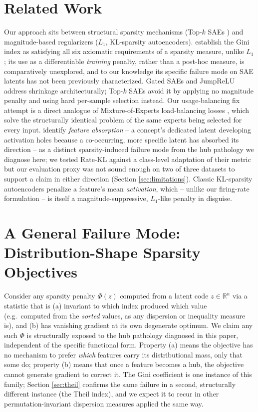 \documentclass[11pt,twocolumn]{article}
\begin{document}
\section{Related Work}
\label{sec:related}
Our approach sits between structural sparsity mechanisms (Top-$k$ SAEs \citep{gao2024topk}) and magnitude-based regularizers ($L_1$, KL-sparsity autoencoders). \citet{hurley2009comparing} establish the Gini index as satisfying all six axiomatic requirements of a sparsity measure, unlike $L_1$; its use as a differentiable \emph{training} penalty, rather than a post-hoc measure, is comparatively unexplored, and to our knowledge its specific failure mode on SAE latents has not been previously characterized. Gated SAEs \citep{lieberum2024gated} and JumpReLU \citep{rajamanoharan2024jumprelu} address shrinkage architecturally; Top-$k$ SAEs \citep{gao2024topk} avoid it by applying no magnitude penalty and using hard per-sample selection instead. Our usage-balancing fix attempt is a direct analogue of Mixture-of-Experts load-balancing losses \citep{shazeer2017outrageously, fedus2022switch}, which solve the structurally identical problem of the same experts being selected for every input. \citet{chanin2024absorption} identify \emph{feature absorption} -- a concept's dedicated latent developing activation holes because a co-occurring, more specific latent has absorbed its direction -- as a distinct sparsity-induced failure mode from the hub pathology we diagnose here; we tested Rate-KL against a class-level adaptation of their metric but our evaluation proxy was not sound enough on two of three datasets to support a claim in either direction (Section \ref{sec:limitations}). Classic KL-sparsity autoencoders \citep{ng2011sparse} penalize a feature's mean \emph{activation}, which -- unlike our firing-rate formulation -- is itself a magnitude-suppressive, $L_1$-like penalty in disguise.

\section{A General Failure Mode: Distribution-Shape Sparsity Objectives}
\label{sec:method-gini}
Consider any sparsity penalty $\Phi(z)$ computed from a latent code $z \in \mathbb{R}^n$ via a statistic that is (a) invariant to which index produced which value (e.g.\ computed from the \emph{sorted} values, as any dispersion or inequality measure is), and (b) has vanishing gradient at its own degenerate optimum. We claim any such $\Phi$ is structurally exposed to the hub pathology diagnosed in this paper, independent of the specific functional form. Property (a) means the objective has no mechanism to prefer \emph{which} features carry its distributional mass, only that some do; property (b) means that once a feature becomes a hub, the objective cannot generate gradient to correct it. The Gini coefficient is one instance of this family; Section \ref{sec:theil} confirms the same failure in a second, structurally different instance (the Theil index), and we expect it to recur in other permutation-invariant dispersion measures applied the same way.
\end{document}
